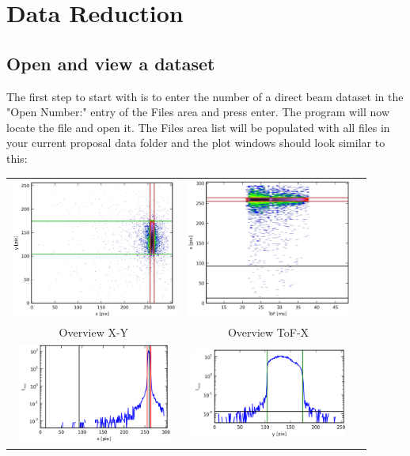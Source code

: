 \chapter{Data Reduction}
\label{chap:data_reduction}

\section{Open and view a dataset}
\label{sec:open_file}
  The first step to start with is to enter the number of a direct beam dataset in the "Open Number:" entry of the Files area and press enter. The program will now locate the file and open it.
  The Files area list will be populated with all files in your current proposal data folder and the plot windows should look similar to this:
  
  \begin{tabular}{ccc}
  \includegraphics[width=155pt]{screenshots/normalizemap1.png} &
  \includegraphics[width=155pt]{screenshots/normalizemap2.png} &\\
  Overview X-Y & Overview ToF-X & \\
  \includegraphics[width=145pt]{screenshots/normalize1.png} &
  \includegraphics[width=145pt]{screenshots/normalize2.png} &

\end{tabular}
